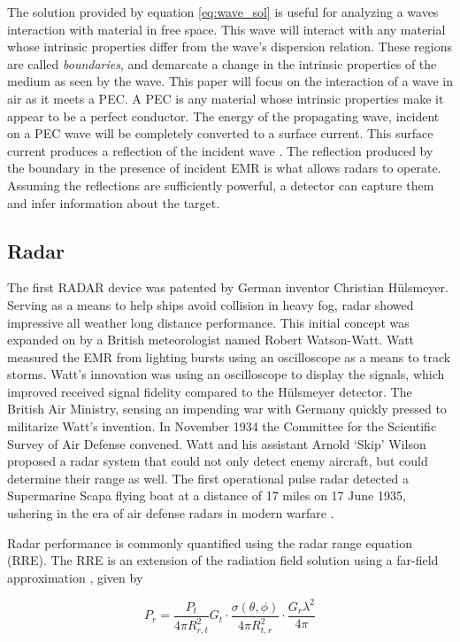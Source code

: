 		The solution provided by equation \ref{eq:wave_sol} is useful for analyzing a waves interaction with material in free space. This wave will interact with any material whose intrinsic properties differ from the wave's dispersion relation. These regions are called \textit{boundaries}, and demarcate a change in the intrinsic properties of the medium as seen by the wave. This paper will focus on the interaction of a wave in air as it meets a \gls{PEC}. A PEC is any material whose intrinsic properties make it appear to be a perfect conductor. The energy of the propagating wave, incident on a PEC wave will be completely converted to a surface current. This surface current produces a reflection of the incident wave \cite{KONG}. The reflection produced by the boundary in the presence of incident EMR is what allows radars to operate. Assuming the reflections are sufficiently powerful, a detector can capture them and infer information about the target.

	\subsection{Radar}
		\label{sec:RD}
	 	The first \gls{RADAR} device was patented by German inventor Christian H{\"u}lsmeyer. Serving as a means to help ships avoid collision in heavy fog, radar showed impressive all weather long distance performance. This initial concept was expanded on by a British meteorologist named Robert Watson-Watt. Watt measured the EMR from lighting bursts using an oscilloscope as a means to track storms. Watt's innovation was using an oscilloscope to display the signals, which improved received signal fidelity compared to the H{\"u}lsmeyer detector. The British Air Ministry, sensing an impending war with Germany quickly pressed to militarize Watt's invention. In November 1934 the Committee for the Scientific Survey of Air Defense convened. Watt and his assistant Arnold `Skip' Wilson proposed a radar system that could not only detect enemy aircraft, but could determine their range as well. The first operational pulse radar detected a Supermarine Scapa flying boat at a distance of 17 miles on 17 June 1935, ushering in the era of air defense radars in modern warfare \cite{Bowen}.

		Radar performance is commonly quantified using the radar range equation (RRE). The RRE is an extension of the radiation field solution using a far-field approximation \cite{KONG}, given by

		\begin{equation}\label{eq:re}
			P_{r} = \frac{P_t}{4 \pi R_{r, t}^2}G_t \cdot \frac{\sigma(\theta, \phi)}{4 \pi R_{t, r}^2} \cdot \frac{G_r \lambda^2}{4 \pi}
		\end{equation}

